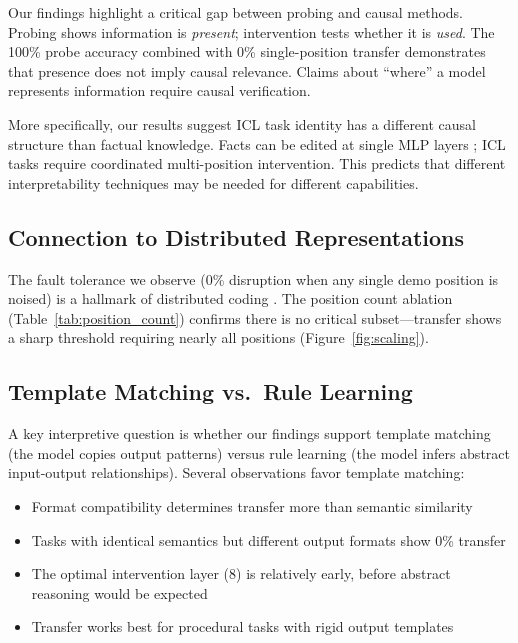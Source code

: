 \documentclass[11pt]{article}
\begin{document}
Our findings highlight a critical gap between probing and causal methods. Probing shows information is \emph{present}; intervention tests whether it is \emph{used}. The 100\% probe accuracy combined with 0\% single-position transfer demonstrates that presence does not imply causal relevance. Claims about ``where'' a model represents information require causal verification.

More specifically, our results suggest ICL task identity has a different causal structure than factual knowledge. Facts can be edited at single MLP layers \citep{meng2022locating}; ICL tasks require coordinated multi-position intervention. This predicts that different interpretability techniques may be needed for different capabilities.

\subsection{Connection to Distributed Representations}

The fault tolerance we observe (0\% disruption when any single demo position is noised) is a hallmark of distributed coding \citep{hinton1986distributed}. The position count ablation (Table~\ref{tab:position_count}) confirms there is no critical subset---transfer shows a sharp threshold requiring nearly all positions (Figure~\ref{fig:scaling}).

\subsection{Template Matching vs.\ Rule Learning}

A key interpretive question is whether our findings support template matching (the model copies output patterns) versus rule learning (the model infers abstract input-output relationships). Several observations favor template matching:

\begin{itemize}
    \item Format compatibility determines transfer more than semantic similarity
    \item Tasks with identical semantics but different output formats show 0\% transfer
    \item The optimal intervention layer (8) is relatively early, before abstract reasoning would be expected
    \item Transfer works best for procedural tasks with rigid output templates
\end{itemize}
\end{document}
